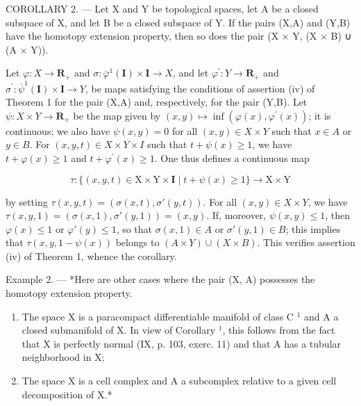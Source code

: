 COROLLARY 2. --- Let X and Y be topological spaces, let A be a closed subspace of X, and let B be a closed subspace of Y. If the pairs (X,A) and (Y,B) have the homotopy extension property, then so does the pair (X × Y, (X × B) ∪ (A × Y)).

Let \(\varphi\colon X\to\mathbf{R}_{+}\) and \(\sigma\colon\overline{\varphi}^{1}(\mathbf{I})\times\mathbf{I}\to X\), and let \(\varphi^{\prime}\colon Y\to\mathbf{R}_{+}\) and \(\sigma^{\prime}\colon\overline{\psi}^{1}(\mathbf{I})\times\mathbf{I}\to Y\), be maps satisfying the conditions of assertion (iv) of Theorem 1 for the pair (X,A) and, respectively, for the pair (Y,B). Let \(\psi\colon X\times Y\to\mathbf{R}_{+}\) be the map given by \((x,y)\mapsto\inf(\varphi(x),\varphi^{\prime}(x))\); it is continuous; we also have \(\psi(x,y)=0\) for all \((x,y)\in X\times Y\) such that \(x\in A\) or \(y\in B\). For \((x,y,t)\in X\times Y\times I\) such that \(t+\psi(x)\geqslant1\), we have \(t+\varphi(x)\geqslant1\) and \(t+\varphi^{\prime}(x)\geqslant1\). One thus defines a continuous map

\[
\tau \colon \{(x, y, t) \in \mathrm{X} \times \mathrm{Y} \times \mathbf {I} \mid t + \psi (x) \geqslant 1 \} \rightarrow \mathrm{X} \times \mathrm{Y}
\]

by setting \(\tau(x,y,t) = (\sigma(x,t),\sigma'(y,t))\). For all \((x,y)\in X\times Y\), we have \(\tau(x,y,1) = (\sigma(x,1),\sigma'(y,1)) = (x,y)\). If, moreover, \(\psi(x,y)\leqslant 1\), then \(\varphi(x)\leqslant 1\) or \(\varphi'(y)\leqslant 1\), so that \(\sigma(x,1)\in A\) or \(\sigma'(y,1)\in B\); this implies that \(\tau(x,y,1 - \psi(x))\) belongs to \((A\times Y)\cup (X\times B)\). This verifies assertion (iv) of Theorem 1, whence the corollary.

Example 2. --- *Here are other cases where the pair (X, A) possesses the homotopy extension property.

\begin{enumerate}
\def\labelenumi{(\roman{enumi})}
\item
  The space X is a paracompact differentiable manifold of class C \(^{1}\) and A a closed submanifold of X. In view of Corollary \(^{1}\), this follows from the fact that X is perfectly normal (IX, p. 103, exerc. 11) and that A has a tubular neighborhood in X;
\item
  The space X is a cell complex and A a subcomplex relative to a given cell decomposition of X.*
\end{enumerate}
